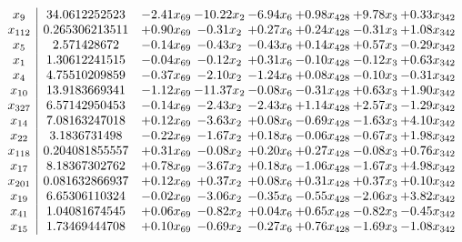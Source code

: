\documentclass[8pt]{article}
\begin{document}
\[\begin{array}{c| c c@{\hskip 2pt} c@{\hskip 2pt} c@{\hskip 2pt} c@{\hskip 2pt} c@{\hskip 2pt} c@{\hskip 2pt} }
 x_{9}   &  34.0612252523 & -2.41 x_{69} & -10.22 x_{2} & -6.94 x_{6} & +  0.98 x_{428} & +  9.78 x_{3} & +  0.33 x_{342}\\
 x_{112}   &  0.265306213511 & +  0.90 x_{69} & -0.31 x_{2} & +  0.27 x_{6} & +  0.24 x_{428} & -0.31 x_{3} & +  1.08 x_{342}\\
 x_{5}   &  2.571428672 & -0.14 x_{69} & -0.43 x_{2} & -0.43 x_{6} & +  0.14 x_{428} & +  0.57 x_{3} & -0.29 x_{342}\\
 x_{1}   &  1.30612241515 & -0.04 x_{69} & -0.12 x_{2} & +  0.31 x_{6} & -0.10 x_{428} & -0.12 x_{3} & +  0.63 x_{342}\\
 x_{4}   &  4.75510209859 & -0.37 x_{69} & -2.10 x_{2} & -1.24 x_{6} & +  0.08 x_{428} & -0.10 x_{3} & -0.31 x_{342}\\
 x_{10}   &  13.9183669341 & -1.12 x_{69} & -11.37 x_{2} & -0.08 x_{6} & -0.31 x_{428} & +  0.63 x_{3} & +  1.90 x_{342}\\
 x_{327}   &  6.57142950453 & -0.14 x_{69} & -2.43 x_{2} & -2.43 x_{6} & +  1.14 x_{428} & +  2.57 x_{3} & -1.29 x_{342}\\
 x_{14}   &  7.08163247018 & +  0.12 x_{69} & -3.63 x_{2} & +  0.08 x_{6} & -0.69 x_{428} & -1.63 x_{3} & +  4.10 x_{342}\\
 x_{22}   &  3.1836731498 & -0.22 x_{69} & -1.67 x_{2} & +  0.18 x_{6} & -0.06 x_{428} & -0.67 x_{3} & +  1.98 x_{342}\\
 x_{118}   &  0.204081855557 & +  0.31 x_{69} & -0.08 x_{2} & +  0.20 x_{6} & +  0.27 x_{428} & -0.08 x_{3} & +  0.76 x_{342}\\
 x_{17}   &  8.18367302762 & +  0.78 x_{69} & -3.67 x_{2} & +  0.18 x_{6} & -1.06 x_{428} & -1.67 x_{3} & +  4.98 x_{342}\\
 x_{201}   &  0.081632866937 & +  0.12 x_{69} & +  0.37 x_{2} & +  0.08 x_{6} & +  0.31 x_{428} & +  0.37 x_{3} & +  0.10 x_{342}\\
 x_{19}   &  6.65306110324 & -0.02 x_{69} & -3.06 x_{2} & -0.35 x_{6} & -0.55 x_{428} & -2.06 x_{3} & +  3.82 x_{342}\\
 x_{41}   &  1.04081674545 & +  0.06 x_{69} & -0.82 x_{2} & +  0.04 x_{6} & +  0.65 x_{428} & -0.82 x_{3} & -0.45 x_{342}\\
 x_{15}   &  1.73469444708 & +  0.10 x_{69} & -0.69 x_{2} & -0.27 x_{6} & +  0.76 x_{428} & -1.69 x_{3} & -1.08 x_{342}\\

\end{array}\]
\end{document}
